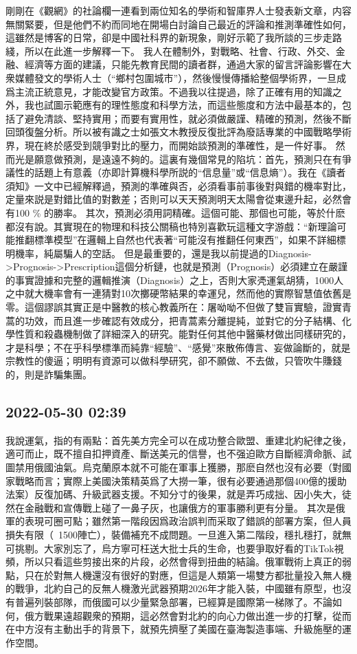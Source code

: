 \documentclass[twocolumn]{ctexart}
\begin{document}
剛剛在《觀網》的社論欄一連看到兩位知名的學術和智庫界人士發表新文章，内容無關緊要，但是他們不約而同地在開場白討論自己最近的評論和推測準確性如何，這雖然是博客的日常，卻是中國社科界的新現象，剛好示範了我所談的三步走路綫，所以在此進一步解釋一下。
我人在體制外，對戰略、社會、行政、外交、金融、經濟等方面的建議，只能先教育民間的讀者群，通過大家的留言評論影響在大衆媒體發文的學術人士（“鄉村包圍城市”），然後慢慢傳播給整個學術界，一旦成爲主流正統意見，才能改變官方政策。不過我以往提過，除了正確有用的知識之外，我也試圖示範應有的理性態度和科學方法，而這些態度和方法中最基本的，包括了避免清談、堅持實用；而要有實用性，就必須做嚴謹、精確的預測，然後不斷回頭復盤分析。所以被有識之士如張文木教授反復批評為廢話專業的中國戰略學術界，現在終於感受到競爭對比的壓力，而開始談預測的準確性，是一件好事。
然而光是願意做預測，是遠遠不夠的。這裏有幾個常見的陷坑：首先，預測只在有爭議性的話題上有意義（亦即計算機科學所説的“信息量”或“信息熵”）。我在《讀者須知》一文中已經解釋過，預測的準確與否，必須看事前事後對與錯的機率對比，定量來説是對錯比值的對數差；否則可以天天預測明天太陽會從東邊升起，必然會有100 \% 的勝率。
其次，預測必須用詞精確。這個可能、那個也可能，等於什麽都沒有說。其實現在的物理和科技公關稿也特別喜歡玩這種文字游戲：“新理論可能推翻標準模型”在邏輯上自然也代表著“可能沒有推翻任何東西”，如果不詳細標明機率，純屬騙人的空話。
但是最重要的，還是我以前提過的Diagnosis->Prognosis->Prescription這個分析鏈，也就是預測（Prognosis）必須建立在嚴謹的事實證據和完整的邏輯推演（Diagnosis）之上，否則大家凴運氣胡猜，1000人之中就大機率會有一連猜對10次擲硬幣結果的幸運兒，然而他的實際智慧值依舊是零。這個謬誤其實正是中醫教的核心教義所在：屠呦呦不但做了雙盲實驗，證實青蒿的功效，而且進一步確認有效成分，把青蒿素分離提純，並對它的分子結構、化學性質和殺蟲機制做了詳細深入的研究。能對任何其他中醫藥材做出同樣研究的，才是科學；不在乎科學標準而純靠“經驗”、“感覺”來散佈傳言、妄做論斷的，就是宗教性的傻逼；明明有資源可以做科學研究，卻不願做、不去做，只管吹牛賺錢的，則是詐騙集團。
\subsection*{2022-05-30 02:39}

我說運氣，指的有兩點：首先美方完全可以在成功整合歐盟、重建北約紀律之後，適可而止，既不擅自扣押資產、斷送美元的信譽，也不强迫歐方自斷經濟命脈、試圖禁用俄國油氣。烏克蘭原本就不可能在軍事上獲勝，那麽自然也沒有必要（對國家戰略而言；實際上美國決策精英爲了大撈一筆，很有必要通過那個400億的援助法案）反復加碼、升級武器支援。不知分寸的後果，就是弄巧成拙、因小失大，徒然在金融戰和宣傳戰上碰了一鼻子灰，也讓俄方的軍事勝利更有分量。
其次是俄軍的表現可圈可點；雖然第一階段因爲政治誤判而采取了錯誤的部署方案，但人員損失有限（~1500陣亡），裝備補充不成問題。一旦進入第二階段，穩扎穩打，就無可挑剔。大家別忘了，烏方寧可枉送大批士兵的生命，也要爭取好看的TikTok視頻，所以只看這些剪接出來的片段，必然會得到扭曲的結論。俄軍戰術上真正的弱點，只在於對無人機還沒有很好的對應，但這是人類第一場雙方都批量投入無人機的戰爭，北約自己的反無人機激光武器預期2026年才能入裝，中國雖有原型，也沒有普遍列裝部隊，而俄國可以少量緊急部署，已經算是國際第一梯隊了。不論如何，俄方戰果遠超觀衆的預期，這必然會對北約的向心力做出進一步的打擊，從而在中方沒有主動出手的背景下，就預先擠壓了美國在臺海製造事端、升級施壓的運作空間。
\end{document}
